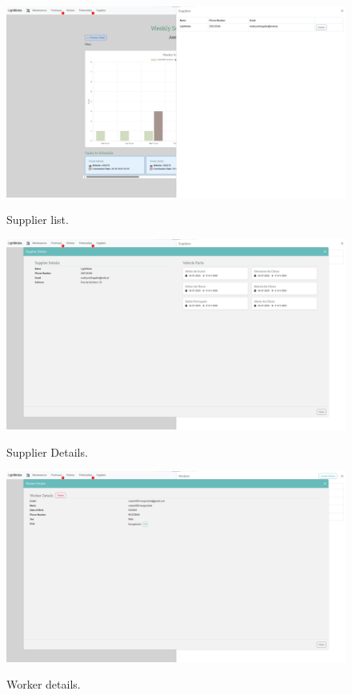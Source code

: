 \begin{figure}[htbp]
  \caption{Supplier list.}
  \centering
  \includegraphics[width=\textwidth]{figs/Implementation/workshopmanager/supplierList}
  \label{fig:workshopmanagerSupplierList}
\end{figure}

\begin{figure}[htbp]
  \caption{Supplier Details.}
  \centering
  \includegraphics[width=\textwidth]{figs/Implementation/workshopmanager/supplierDetails}
  \label{fig:workshopmanagerupplierDetails}
\end{figure}


\begin{figure}[htbp]
  \caption{Worker details.}
  \centering
  \includegraphics[width=\textwidth]{figs/Implementation/workshopmanager/workerDetails}
  \label{fig:workerDetails}
\end{figure}



